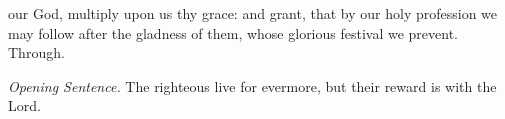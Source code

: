 \clearpage
{}

{} our God, multiply upon us thy grace: and grant, that by our holy profession we may follow after the gladness of them, whose glorious festival we prevent. Through.


\vspace{-0.5\baselineskip}

\label{AllHallows}
\par\noindent
\textit{Opening Sentence.} The righteous live for evermore, but their reward is with the Lord.

